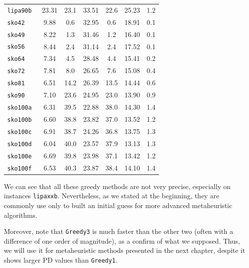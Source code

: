 \begin{table}
\begin{tabular}{l*{6}{S}}
   \texttt{lipa90b       }  &  23.31  &   23.1 &  33.51  &   22.6 &  25.23  &    1.2\\
\texttt{sko42           }  &   9.88  &    0.6 &  32.95  &    0.6 &  18.91  &    0.1\\
\texttt{sko49           }  &   8.22  &    1.3 &  31.46  &    1.2 &  16.40  &    0.1\\
   \texttt{sko56           }  &   8.44  &    2.4 &  31.14  &    2.4 &  17.52  &    0.1\\
\texttt{sko64           }  &   7.34  &    4.5 &  28.48  &    4.4 &  15.41  &    0.2\\
  \texttt{sko72           }  &   7.81  &    8.0 &  26.65  &    7.6 &  15.08  &    0.4\\
   \texttt{sko81         }  &   6.51  &   14.2 &  26.39  &   13.5 &  14.44  &    0.6\\
   \texttt{sko90           }  &   7.10  &   23.6 &  24.95  &   23.0 &  13.90  &    0.9\\
\texttt{sko100a         }  &   6.31  &   39.5 &  22.88  &   38.0 &  14.30  &    1.4\\
\texttt{sko100b         }  &   6.60  &   38.8 &  23.82  &   37.0 &  13.52  &    1.2\\
\texttt{sko100c        }  &   6.91  &   38.7 &  24.26  &   36.8 &  13.75  &    1.3\\
\texttt{sko100d        }  &   6.04  &   40.0 &  23.57  &   37.9 &  13.13  &    1.3\\
\texttt{sko100e        }  &   6.69  &   39.8 &  23.98  &   37.1 &  13.42  &    1.2\\
\texttt{sko100f         }  &   6.53  &   40.3 &  23.87  &   38.4 &  14.10  &    1.4\\
		\bottomrule
	\end{tabular}
\end{table}

We can see that all these greedy methods are not very precise, especially on instances \texttt{lipaxxb}. Nevertheless, as we stated at the beginning, they are commonly use only to built an initial guess for more advanced metaheuristic algorithms. 

Moreover, note that \texttt{Greedy3} is much faster than the other two (often with a difference of one order of magnitude), as a confirm of what we supposed. Thus, we will use it for metaheuristic methods presented in the next chapter, despite it shows larger PD values than \texttt{Greedy1}.